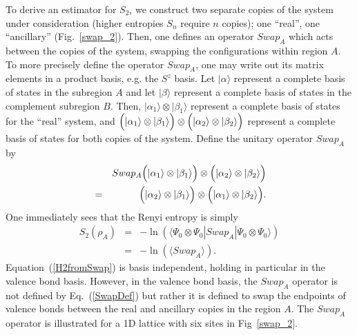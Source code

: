 \documentclass[prl,aps,twocolumn,floatfix,amsmath,amssymb,superscriptaddress,tightenlines]{revtex4}
\begin{document}
To derive an estimator for $S_2$, we construct two separate copies of the
system under consideration (higher entropies $S_n$ require $n$ copies); one ``real'', one ``ancillary'' (Fig.~\ref{swap_2}).
Then, one defines an
operator $Swap_A$ which acts between the copies of the system, swapping the
configurations within region $A$.  To more precisely define the operator
$Swap_A$, one may write out its matrix elements in a product basis, e.g. the $S^z$ basis.
Let $|\alpha\rangle$  represent a complete basis of states in the subregion
$A$ and let $|\beta\rangle$ represent a complete basis of states in
the complement subregion $B$.  Then, $|\alpha_1 \rangle \otimes |\beta_1 \rangle$ represent
a complete basis of states for the ``real'' system, and
$\Bigl( |\alpha_1\rangle \otimes |\beta_1\rangle \Bigr) \otimes
\Bigl( |\alpha_2\rangle \otimes |\beta_2\rangle \Bigr)$
represent a complete basis of states for both copies of the system.
Define the unitary operator $Swap_A$ by
\begin{eqnarray}
\label{SwapDef}
&& Swap_A \Bigl( |\alpha_1\rangle \otimes |\beta_1\rangle \Bigr) \otimes
\Bigl( |\alpha_2\rangle \otimes |\beta_2\rangle \Bigr) \nonumber \\ &=&
\Bigl( |\alpha_2\rangle \otimes |\beta_1\rangle \Bigr) \otimes
\Bigl( |\alpha_1\rangle \otimes |\beta_2\rangle \Bigr).
\end{eqnarray}
One immediately sees that the Renyi entropy is simply
\begin{eqnarray}
\label{H2fromSwap}
S_2(\rho_A) &=&-\ln(\langle \Psi_0\otimes \Psi_0|Swap_A|\Psi_0\otimes \Psi_0\rangle) 
\nonumber
\\
&=&-\ln(\langle Swap_A \rangle). \label{s2}
\end{eqnarray}
Equation~(\ref{H2fromSwap}) is basis independent, holding in particular in the valence
bond basis.  However, in the valence bond basis, the $Swap_A$ operator is
not defined by Eq.~(\ref{SwapDef}) but rather it is defined to
swap the endpoints of valence bonds between the real and ancillary copies in the region $A$.
The $Swap_A$ operator is illustrated for a 1D lattice with six sites in Fig~\ref{swap_2}.  
\end{document}
